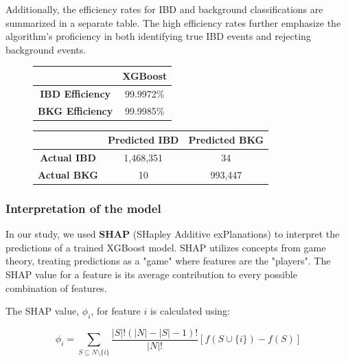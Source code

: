 Additionally, the efficiency rates for IBD and background classifications are summarized in a separate table. The high efficiency rates further emphasize the algorithm's proficiency in both identifying true IBD events and rejecting background events.


\begin{figure}[h]
	\centering
	\begin{minipage}{0.33\textwidth}
	\centering
	\begin{tabular}{cc}
		\toprule
		& \textbf{XGBoost} \\
		\midrule
		\textbf{IBD Efficiency} & 99.9972\% \\
		\textbf{BKG Efficiency} & 99.9985\% \\
		\bottomrule
	\end{tabular}
	\end{minipage}
	\begin{minipage}{0.65\textwidth}
	\centering
	\begin{tabular}{ccc}
		\toprule
		& \textbf{Predicted IBD} & \textbf{Predicted BKG} \\
		\midrule
		\textbf{Actual IBD} & 1,468,351 & 34 \\
		\textbf{Actual BKG} & 10 & 993,447 \\
		\bottomrule
	\end{tabular}
	\label{tab:conf_matrix_xgb}
\end{minipage}
\end{figure}




\subsubsection{Interpretation of the model}
In our study, we used \textbf{SHAP} (SHapley Additive exPlanations) to interpret the predictions of a trained XGBoost model. SHAP utilizes concepts from game theory, treating predictions as a "game" where features are the "players". The SHAP value for a feature is its average contribution to every possible combination of features.

The SHAP value, \(\phi_i\), for feature \(i\) is calculated using:

\begin{equation}
	\phi_i = \sum_{S \subseteq N \setminus \{i\}} \frac{|S|!(|N| - |S| - 1)!}{|N|!} [f(S \cup \{i\}) - f(S)]
\end{equation}

